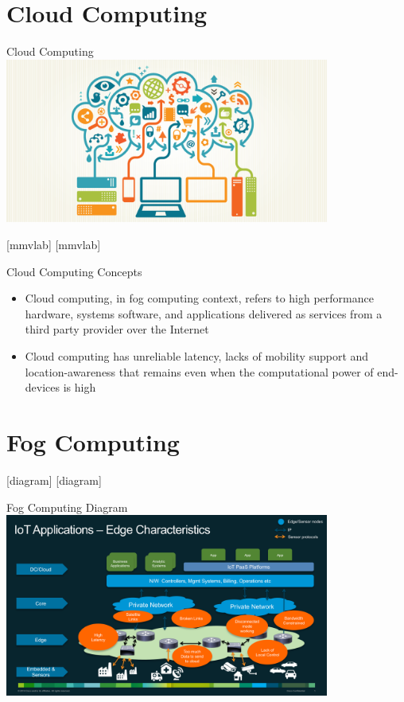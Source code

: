 \documentclass{beamer}
\begin{document}
\section{Cloud Computing}

\begin{frame}{Cloud Computing}
\centering
\includegraphics[width=0.8\textwidth]{images/cloud}
\end{frame}


[mmvlab]
[mmvlab]

\begin{frame}{Cloud Computing Concepts}
\begin{itemize}
\item Cloud computing, in fog computing context, refers to high performance hardware, systems software, and applications delivered as services from a third party provider over the Internet
\item Cloud computing has unreliable latency, lacks of mobility support and location-awareness that remains even when the computational power of end-devices is high 
\end{itemize}
\end{frame}

\section{Fog Computing}

[diagram]
[diagram]

\begin{frame}{Fog Computing Diagram}
\centering
\includegraphics[width=0.8\textwidth]{images/fog}
\end{frame}
\end{document}
